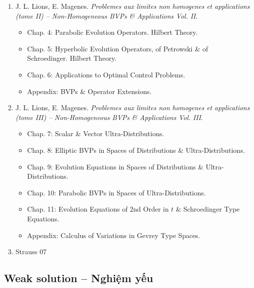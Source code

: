 \documentclass{article}
\begin{document}
\begin{enumerate}
	\item {\sc J. L. Lions, E. Magenes}. {\it Problemes aux limites non homogenes et applications (tome II) -- Non-Homogeneous BVPs \& Applications Vol. II}.
	\begin{itemize}
		\item {\sf Chap. 4: Parabolic Evolution Operators. Hilbert Theory.}
		\item {\sf Chap. 5: Hyperbolic Evolution Operators, of Petrowski \& of Schroedinger. Hilbert Theory.}
		\item {\sf Chap. 6: Applications to Optimal Control Problems.}
		\item {\sf Appendix: BVPs \& Operator Extensions.}
	\end{itemize}
	
	\item {\sc J. L. Lions, E. Magenes}. {\it Problemes aux limites non homogenes et applications (tome III) -- Non-Homogeneous BVPs \& Applications Vol. III}.
	\begin{itemize}
		\item {\sf Chap. 7: Scalar \& Vector Ultra-Distributions.}
		\item {\sf Chap. 8: Elliptic BVPs in Spaces of Distributions \& Ultra-Distributions.}
		\item {\sf Chap. 9: Evolution Equations in Spaces of Distributions \& Ultra-Distributions.}
		\item {\sf Chap. 10: Parabolic BVPs in Spaces of Ultra-Distributions.}
		\item {\sf Chap. 11: Evolution Equations of 2nd Order in $t$ \& Schroedinger Type Equations.}
		\item {\sf Appendix: Calculus of Variations in Gevrey Type Spaces.}
	\end{itemize}
	
	\item Strauss 07
\end{enumerate}


\subsection{Weak solution -- Nghiệm yếu}
\end{document}
